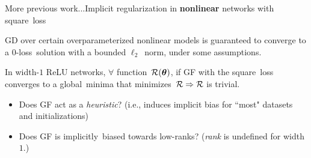 \documentclass[handout,usenames,dvipsnames]{beamer} %
\newcommand{\btheta}{{\boldsymbol{\theta}}}
\newcommand{\calr}{{\cal R}}
\begin{document}
\begin{frame}{More previous work...}{Implicit regularization in \textbf{nonlinear} networks with square~loss}
    \begin{block}{\cite{oymak2019overparameterized}}
         GD over certain overparameterized nonlinear models is guaranteed to converge to a 0-loss~solution with a bounded $\ell_2$~norm, under some assumptions.
    \end{block}
    \begin{block}{\cite{vardi2021implicit}}
         In width-$1$ ReLU networks, $\forall$ function~$\calr(\btheta)$, if  GF with the square~loss converges to a global~minima that minimizes~$\calr \Rightarrow \calr$ is \alert{trivial}.
    \end{block}
    \begin{itemize}
        \item Does GF act as a \emph{heuristic}? (i.e., induces implicit bias for ``most" datasets and initializations)
        \item Does GF is implicitly~biased towards low-ranks? (\emph{rank} is undefined for width $1$.)
    \end{itemize}
    

\end{frame}
\end{document}
